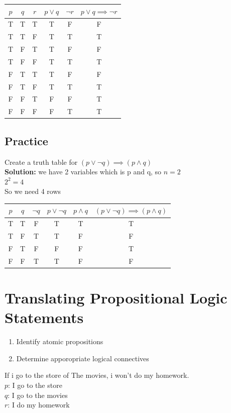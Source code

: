 \documentclass{article}
\begin{document}
\begin{enumerate}
		\begin{tabular}{|c|c|c|c|c|c|}
			\hline
			$ p $ & $ q $ & $ r $ & $ p \lor q $ & $ \neg r $ & $ p \lor q \implies \neg r $\\
			\hline
			T & T & T & T & F & F\\
			T & T & F & T & T & T\\
			T & F & T & T & F & F\\
			T & F & F & T & T & T\\
			F & T & T & T & F & F\\
			F & T & F & T & T & T\\
			F & F & T & F & F & T\\
			F & F & F & F & T & T\\
			\hline
		\end{tabular}
\end{enumerate}
\subsection{Practice}
Create a truth table for $(p \lor \neg q) \implies (p \land q)$ \\


\textbf{Solution:}
we have 2 variables which is p and q, so $ n = 2 $\\
$2^2 = 4$\\
So we need 4 rows \\


\begin{tabular}{|c|c|c|c|c|c|}
	\hline
	$ p $ & $ q $ & $ \neg q $ & $ p \lor \neg q $ & $ p \land q $ & $(p \lor \neg q) \implies (p \land q)$ \\
	\hline
	T & T & F & T & T & T \\
	T & F & T & T & F & F \\
	F & T & F & F & F & T \\
	F & F & T & T & F & F \\
	\hline
\end{tabular}

\clearpage
\section{Translating Propositional Logic Statements}
\begin{enumerate}
	\item Identify atomic propositions
	\item Determine apporopriate logical connectives
\end{enumerate}
If i go to the store of The movies, i won't do my homework.\\
$ p $: I go to the store \\
$ q $: I go to the movies \\
$ r $: I do my homework \\
\end{document}
